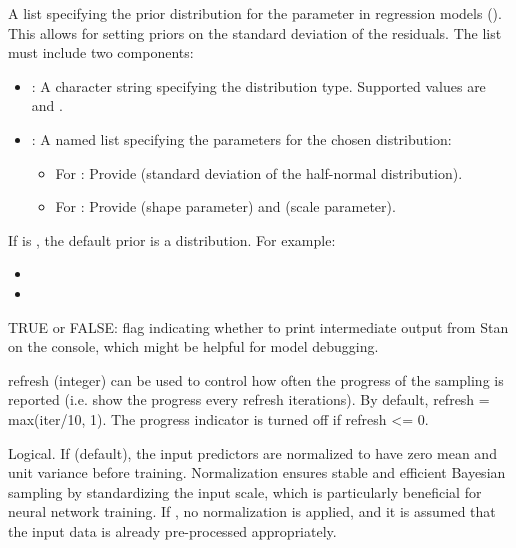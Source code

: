 \documentclass[a4paper]{book}
\begin{document}
\begin{Arguments}
\begin{ldescription}
\begin{itemize}
\end{itemize}


\item[\code{prior\_sigma}] A list specifying the prior distribution for the  parameter in regression
models (). This allows for setting priors on the standard deviation of the residuals.
The list must include two components:
\begin{itemize}

\item{} : A character string specifying the distribution type. Supported values are
 and .
\item{} : A named list specifying the parameters for the chosen distribution:
\begin{itemize}

\item{} For : Provide  (standard deviation of the half-normal distribution).
\item{} For : Provide  (shape parameter) and  (scale parameter).

\end{itemize}


\end{itemize}

If  is , the default prior is a  distribution.
For example:
\begin{itemize}

\item{} 
\item{} 

\end{itemize}


\item[\code{verbose}] TRUE or FALSE: flag indicating whether to print intermediate output from Stan on the console, which might be helpful for model debugging.

\item[\code{refresh}] refresh (integer) can be used to control how often the progress of the sampling is reported (i.e. show the progress every refresh iterations). By default, refresh = max(iter/10, 1). The progress indicator is turned off if refresh <= 0.

\item[\code{normalize}] Logical. If  (default), the input predictors
are normalized to have zero mean and unit variance before training.
Normalization ensures stable and efficient Bayesian sampling by standardizing
the input scale, which is particularly beneficial for neural network training.
If , no normalization is applied, and it is assumed that the input data
is already pre-processed appropriately.


\end{ldescription}
\end{Arguments}
\end{document}
